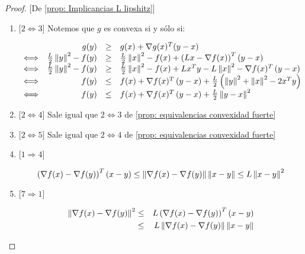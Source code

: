 \begin{proof}{[De \ref{prop: Implicancias L lipshitz}]}
	\begin{enumerate}
		\item {[$2 \Longleftrightarrow 3$]} Notemos que $g$ es convexa si y s\'olo si:
		
		\begin{equation*}
		\begin{array}{lrcl}
		& g(y) & \geq & g(x) + \nabla g(x) ^T (y-x) \\
		\Longleftrightarrow & \frac{L}{2}\left\lVert y\right\rVert^2 -  f(y)  & \geq & \frac{L}{2}\left\lVert x\right\rVert^2 -  f(x) + \left(Lx - \nabla f(x)\right)^T \left(y-x\right) \\
		\Longleftrightarrow & \frac{L}{2}\left\lVert y\right\rVert^2 -  f(y)  & \geq & \frac{L}{2}\left\lVert x\right\rVert^2 -  f(x) + Lx^Ty - L\left\lVert x\right\rVert^2 - \nabla f(x)^T \left(y-x\right) \\
		\Longleftrightarrow &f(y)   & \leq & f(x) + \nabla f(x)^T \left(y-x\right) + \frac{L}{2}\left(\left\lVert y\right\rVert^2 + \left\lVert x\right\rVert^2 -2 x^Ty\right)\\
		\Longleftrightarrow &f(y)   & \leq & f(x) + \nabla f(x)^T \left(y-x\right) + \frac{L}{2}\left\lVert y-x\right\rVert^2\\
		\end{array}
		\end{equation*}
		
		\item {[$2 \Longleftrightarrow 4$]} Sale igual que $2 \Longleftrightarrow 3$ de \ref{prop: equivalencias convexidad fuerte}
		
		\item {[$2 \Longleftrightarrow 5$]} Sale igual que $2 \Longleftrightarrow 4$ de \ref{prop: equivalencias convexidad fuerte}
		
		\item {[$1 \Longrightarrow 4$]} 
		
		\begin{equation*}
		\left(\nabla f(x) - \nabla f(y)\right)^T \left(x-y\right) \leq \left\lVert\nabla f(x) - \nabla f(y)\right\rVert\left\lVert x-y\right\rVert \leq L \left\lVert x-y\right\rVert^2 
		\end{equation*}
		
		\item {[$7 \Longrightarrow 1$]} 
		
		\begin{equation*}
		\begin{aligned}
		\left\lVert\nabla f(x) - \nabla f(y)\right\rVert^2 & \leq & L \left(\nabla f(x) - \nabla f(y)\right)^T \left(x-y\right) \\ & \leq & L\left\lVert\nabla f(x) - \nabla f(y)\right\rVert\left\lVert x-y\right\rVert
		\end{aligned}
		\end{equation*} 
		

\end{enumerate}
\end{proof}
